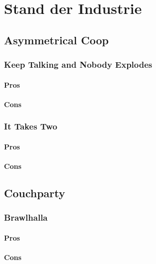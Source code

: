 \chapter{Stand der Industrie\label{_industrie}}

\section{Asymmetrical Coop}

\subsection{Keep Talking and Nobody Explodes}

\subsubsection{Pros}

\subsubsection{Cons}

\subsection{It Takes Two}

\subsubsection{Pros}

\subsubsection{Cons}

\section{Couchparty}

\subsection{Brawlhalla}

\subsubsection{Pros}

\subsubsection{Cons}

